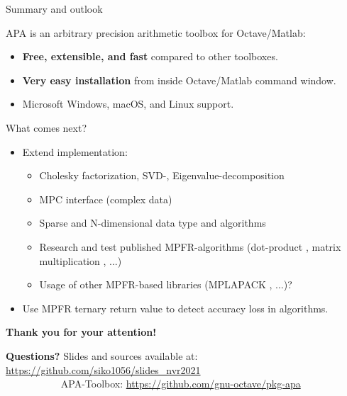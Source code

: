 \begin{frame}{Summary and outlook}

APA is an arbitrary precision arithmetic toolbox for Octave/Matlab:

\begin{itemize}\itemsep0.5em
\item
\textbf{Free, extensible, and fast} compared to other toolboxes.

\item
\textbf{Very easy installation} from inside Octave/Matlab command window.

\item
Microsoft Windows, macOS, and Linux support.
\end{itemize}

\bigskip

What comes next?
\begin{itemize}\itemsep0.5em
\item
Extend implementation:
\begin{itemize}
\item
Cholesky factorization, SVD-, Eigenvalue-decomposition

\item
MPC interface (complex data)

\item
Sparse and N-dimensional data type and algorithms

\item
Research and test published MPFR-algorithms
(dot-product \cite{Isupov2020}, matrix multiplication \cite{Kouya2016}, ...)

\item
Usage of other MPFR-based libraries (MPLAPACK \cite{Nakata2021}, ...)?
\end{itemize}

\item
Use MPFR ternary return value to detect accuracy loss in algorithms.
\end{itemize}
\end{frame}


\begin{frame}
\begin{center}
\textbf{\Large Thank you for your attention!}

\bigskip

\bigskip

\textbf{\Large Questions?}
\vfill\footnotesize
Slides and sources available at:
{\color{DarkBlue}\url{https://github.com/siko1056/slides_nvr2021}} \\[1em]
$\qquad\qquad\quad\;\;$APA-Toolbox:
{\color{DarkBlue}\url{https://github.com/gnu-octave/pkg-apa}}

\end{center}
\end{frame}
